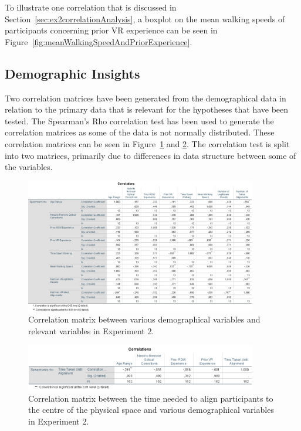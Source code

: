 To illustrate one correlation that is discussed in Section~\ref{sec:ex2correlationAnalysis}, a boxplot on the mean walking speeds of participants concerning prior VR experience can be seen in Figure~\ref{fig:meanWalkingSpeedAndPriorExperience}.

\subsection{Demographic Insights}
Two correlation matrices have been generated from the demographical data in relation to the primary data that is relevant for the hypotheses that have been tested. The Spearman's Rho correlation test has been used to generate the correlation matrices as some of the data is not normally distributed. These correlation matrices can be seen in Figure~\ref{fig:ex2correlation1} and \ref{fig:ex2correlation2}. The correlation test is split into two matrices, primarily due to differences in data structure between some of the variables. 

\begin{figure}
    \centering
    \includegraphics[width=0.9\textwidth]{figures/graphs/Ex2Correlations1.png}
    \caption[Demographical Correlation Matrix 1 for Experiment 2]{Correlation matrix between various demographical variables and relevant variables in Experiment 2.}
    \label{fig:ex2correlation1}
\end{figure}

\begin{figure}[tbph]
    \centering
    \includegraphics[width=0.9\textwidth]{figures/graphs/Ex2Correlations2.png}
    \caption[Demographical Correlation Matrix 2 for Experiment 2]{Correlation matrix between the time needed to align participants to the centre of the physical space and various demographical variables in Experiment 2.}
    \label{fig:ex2correlation2}
\end{figure}

